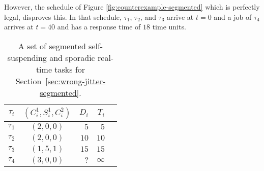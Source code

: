 However, the schedule of Figure \ref{fig:counterexample-segmented} which is perfectly legal, disproves this.
In that schedule, $\tau_1$, $\tau_2$, and $\tau_3$ arrive at $t=0$ and a job of $\tau_4$ arrives at $t=40$ and has a response time of 
$18$ time units.

\begin{table}[t]
\begin{center}
\begin{tabular}{|c||c|r|r|r|}
\hline
$\tau_i$ & $(C_i^1, S_i^1, C_i^2)$   &   $D_i$  &     $T_i$     \\ \hline
$\tau_1$ &  $(2, 0, 0)$                    &     $5$  &       $5$     \\ \hline
$\tau_2$ &  $(2, 0, 0)$                    &    $10$  &      $10$     \\ \hline
$\tau_3$ &  $(1, 5, 1)$            &    $15$  &      $15$     \\ \hline
$\tau_4$ &  $(3, 0, 0)$                   &    $?$  &   $\infty$    \\ \hline     
\end{tabular}
\end{center}
\caption{A set of segmented self-suspending and sporadic real-time tasks for Section~\ref{sec:wrong-jitter-segmented}.}
\label{tab:counterexample-segmented}
\end{table}

